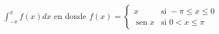 \item $\displaystyle \int_{-\pi}^\pi f(x) dx$ en donde $f(x) = \begin{cases} x & \text{si } -\pi \le x \le 0 \\ \operatorname{sen} x & \text{si } 0 < x \le \pi \end{cases}$
